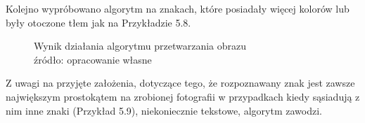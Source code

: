 \documentclass[eng,oneside]{mgr}
\begin{document}
\par Kolejno wypróbowano algorytm na znakach, które posiadały więcej kolorów lub były otoczone tłem jak na Przykładzie 5.8.
\begin{figure}[htbp]
\centering
\captionsetup{justification=centering}
\quad
{}
\renewcommand\figurename{Przykład}
\caption{Wynik działania algorytmu przetwarzania obrazu\\ 
źródło: opracowanie własne}
\end{figure} \newpage
\par Z uwagi na przyjęte założenia, dotyczące tego, że rozpoznawany znak jest zawsze największym prostokątem na zrobionej fotografii w przypadkach kiedy sąsiadują z nim inne znaki (Przykład 5.9), niekoniecznie tekstowe, algorytm zawodzi. 
\end{document}
